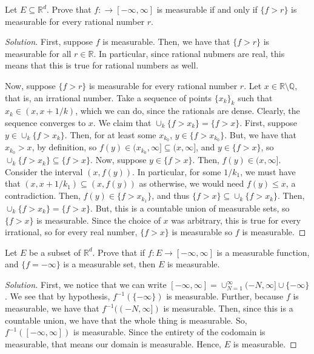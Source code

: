 \documentclass[10pt]{article}
\newenvironment{problem}[2][Problem]{\begin{trivlist}
\item[\hskip \labelsep {\bfseries #1}\hskip \labelsep {\bfseries #2.}]}{\end{trivlist}}
\begin{document}
\begin{problem}{3.1.15}

Let $E \subseteq \mathbb{R}^d$. Prove that $f: \to [-\infty,\infty]$ is measurable if and only if $\{ f > r \}$ is measurable for every rational number $r$.

\end{problem}
\begin{proof}[Solution]

First, suppose $f$ is measurable. Then, we have that $\{ f > r \}$ is measurable for all $r \in \mathbb{R}$. In particular, since rational nubmers are real, this means that this is true for rational numbers as well.

Now, suppose $\{ f > r \}$ is measurable for every rational number $r$. Let $x \in \mathbb{R} \setminus \mathbb{Q}$, that is, an irrational number. Take a sequence of points $\{ x_k \}_k$ such that $x_k \in (x,x + 1/k)$, which we can do, since the rationals are dense. Clearly, the sequence converges to $x$. We claim that $\cup_k \{ f > x_k \} = \{ f > x \}$. First, suppose $y \in \cup_k \{ f > x_k \}$. Then, for at least some $x_{k_0}$, $ y \in \{ f > x_{k_0} \}$. But, we have that $x_{k_0} > x$, by definition, so $f(y) \in (x_{k_0},\infty] \subseteq (x,\infty]$, and $y \in \{ f > x \}$, so $\cup_k \{ f > x_k \} \subseteq \{ f > x \}$. Now, suppose $y \in \{ f > x \}$. Then, $f(y) \in (x,\infty]$. Consider the interval $(x,f(y))$. In particular, for some $1/k_1$, we must have that $(x,x + 1/k_1) \subseteq (x,f(y))$ as otherwise, we would need $f(y) \leq x$, a contradiction. Then, $f(y) \in \{ f > x_{k_1} \}$, and thus $ \{ f > x \} \subseteq \cup_k \{ f > x_k \}$. Then, $\cup_k \{ f > x_k \} = \{ f > x \}$. But, this is a countable union of measurable sets, so $\{ f > x \}$ is measurable. Since the choice of $x$ was arbitrary, this is true for every irrational, so for every real number, $\{ f > x \}$ is measurable so $f$ is measurable.
\end{proof}

\begin{problem}{3.1.16}

Let $E$ be a subset of $\mathbb{R}^d$. Prove that if $f: E \to [-\infty,\infty]$ is a measurable function, and $\{ f = -\infty \}$ is a measurable set, then $E$ is measurable.

\end{problem}
\begin{proof}[Solution]

First, we notice that we can write $[-\infty, \infty] = \cup_{N=1}^\infty (-N,\infty] \cup \{ -\infty \}$. We see that by hypothesis, $f^{-1}(\{ -\infty \})$ is measurable. Further, because $f$ is measurable, we have that $f^{-1}( (-N,\infty])$ is measurable. Then, since this is a countable union, we have that the whole thing is measurable. So, $f^{-1}([-\infty,\infty])$ is measurable. Since the entirety of the codomain is measurable, that means our domain is measurable. Hence, $E$ is measurable.

\end{proof}
\end{document}

